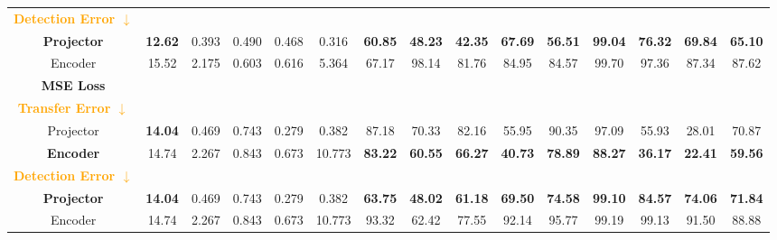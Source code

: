 \begin{table*}[ht]
{\begin{tabular}{cc|cccc|ccccccccc}
    \midrule
    \textcolor{orange}{\textbf{Detection Error $\downarrow$}} \\
    \rowcolor{green!25}
    \textbf{Projector} & \textbf{12.62} & 0.393 & 0.490 & 0.468 & 0.316 & \textbf{60.85} & \textbf{48.23} & \textbf{42.35} & \textbf{67.69} & \textbf{56.51} & \textbf{99.04} & \textbf{76.32} & \textbf{69.84} & \textbf{65.10} \\
    
    Encoder & 15.52 & 2.175 & 0.603 & 0.616 & 5.364 & 67.17 & 98.14 & 81.76 & 84.95 & 84.57 & 99.70 & 97.36 & 87.34 & 87.62 \\
    \hline \hline
    
    \toprule
    \rowcolor[gray]{0.9}
    \textbf{MSE Loss} \\
    \textcolor{orange}{\textbf{Transfer Error $\downarrow$}} \\
    Projector & \textbf{14.04} & 0.469 & 0.743 & 0.279 & 0.382 & 87.18 & 70.33 & 82.16 & 55.95 & 90.35 & 97.09 & 55.93 & 28.01 & 70.87 \\
    \rowcolor{yellow!50}
    \textbf{Encoder} & 14.74 & 2.267 & 0.843 & 0.673 & 10.773 & \textbf{83.22} & \textbf{60.55} & \textbf{66.27} & \textbf{40.73} & \textbf{78.89} & \textbf{88.27} & \textbf{36.17} & \textbf{22.41} & \textbf{59.56} \\ %
    \midrule
    \textcolor{orange}{\textbf{Detection Error $\downarrow$}} \\
    \rowcolor{green!25}
    \textbf{Projector} & \textbf{14.04} & 0.469 & 0.743 & 0.279 & 0.382 & \textbf{63.75} & \textbf{48.02} & \textbf{61.18} & \textbf{69.50} & \textbf{74.58} & \textbf{99.10} & \textbf{84.57} & \textbf{74.06} & \textbf{71.84} \\
    Encoder & 14.74 & 2.267 & 0.843 & 0.673 & 10.773 & 93.32 & 62.42 & 77.55 & 92.14 & 95.77 & 99.19 & 99.13 & 91.50 & 88.88 \\
    \bottomrule
    \end{tabular}}
\end{table*}
